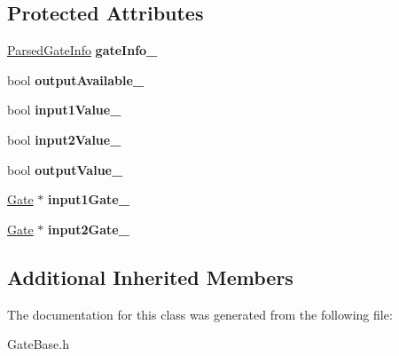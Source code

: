 \subsection*{Protected Attributes}
\begin{DoxyCompactItemize}
\item 
\hyperlink{structParsedGateInfo}{Parsed\+Gate\+Info} {\bfseries gate\+Info\+\_\+}\hypertarget{classGateBase_aa8a69dba4b7d5cfae7529f1e0175d71e}{}\label{classGateBase_aa8a69dba4b7d5cfae7529f1e0175d71e}

\item 
bool {\bfseries output\+Available\+\_\+}\hypertarget{classGateBase_ae160a4ee816258d731c4f8b8803a1cc2}{}\label{classGateBase_ae160a4ee816258d731c4f8b8803a1cc2}

\item 
bool {\bfseries input1\+Value\+\_\+}\hypertarget{classGateBase_a7be516102b62c6acfa431f5d7c87b35a}{}\label{classGateBase_a7be516102b62c6acfa431f5d7c87b35a}

\item 
bool {\bfseries input2\+Value\+\_\+}\hypertarget{classGateBase_a2dcbadc2668619ca104a4239db1c4208}{}\label{classGateBase_a2dcbadc2668619ca104a4239db1c4208}

\item 
bool {\bfseries output\+Value\+\_\+}\hypertarget{classGateBase_af332cdd768672c9ecb99959196db8f59}{}\label{classGateBase_af332cdd768672c9ecb99959196db8f59}

\item 
\hyperlink{classGate}{Gate} $\ast$ {\bfseries input1\+Gate\+\_\+}\hypertarget{classGateBase_aae8c335a20c84315495da4e2f988aecf}{}\label{classGateBase_aae8c335a20c84315495da4e2f988aecf}

\item 
\hyperlink{classGate}{Gate} $\ast$ {\bfseries input2\+Gate\+\_\+}\hypertarget{classGateBase_ab3214c7cf6e29f1da6f37e08f41eccfb}{}\label{classGateBase_ab3214c7cf6e29f1da6f37e08f41eccfb}

\end{DoxyCompactItemize}
\subsection*{Additional Inherited Members}


The documentation for this class was generated from the following file\+:\begin{DoxyCompactItemize}
\item 
Gate\+Base.\+h\end{DoxyCompactItemize}
